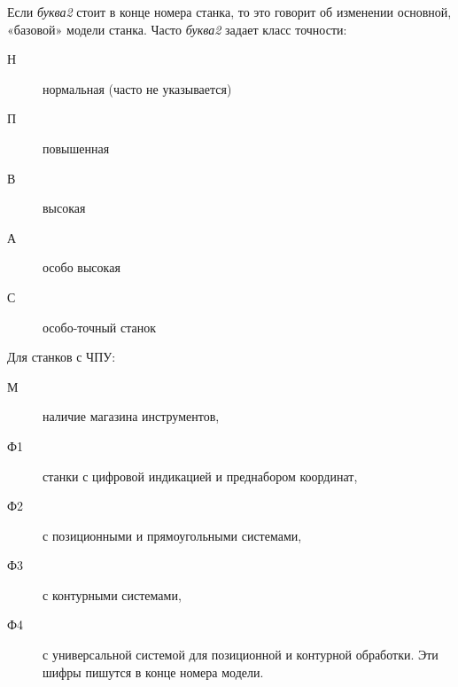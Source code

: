 Если \emph{буква2} стоит в конце номера станка, то это говорит об
изменении основной, «базовой» модели станка. Часто \emph{буква2} задает класс
точности:

\begin{description}
\item[Н] нормальная (часто не указывается)
\item[П] повышенная
\item[В] высокая
\item[А] особо высокая
\item[С] особо-точный станок
\end{description}

Для станков с ЧПУ:
\begin{description}
\item[М] наличие магазина инструментов,
\item[Ф1] станки с цифровой индикацией и преднабором координат,
\item[Ф2] с позиционными и прямоугольными системами,
\item[Ф3] с контурными системами,
\item[Ф4] с универсальной системой для позиционной и контурной обработки. Эти
шифры пишутся в конце номера модели.
\end{description}

